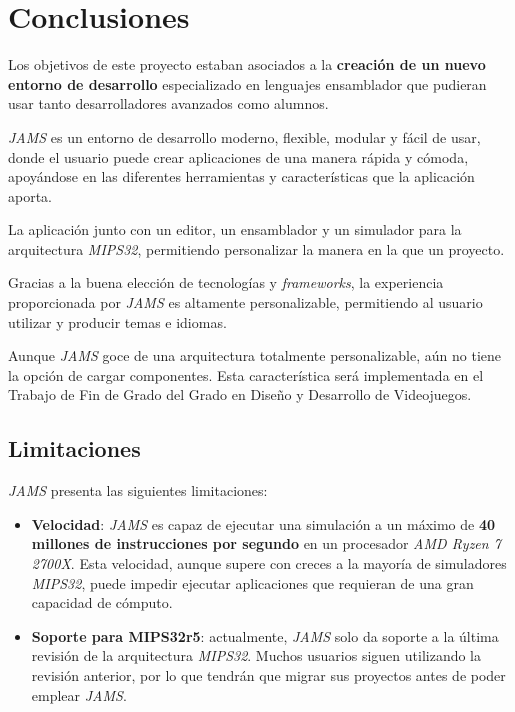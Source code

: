 \chapter{Conclusiones}\label{ch:conclusiones}

Los objetivos de este proyecto estaban asociados a la \textbf{creación
de un nuevo entorno de desarrollo} especializado en lenguajes
ensamblador que pudieran usar tanto desarrolladores avanzados
como alumnos.

\textit{JAMS} es un entorno de desarrollo moderno,
flexible, modular y fácil de usar, donde el usuario puede
crear aplicaciones de una manera rápida y cómoda,
apoyándose en las diferentes herramientas y
características que la aplicación aporta.

La aplicación  junto con un
editor, un ensamblador y un simulador para la arquitectura
\textit{MIPS32}, permitiendo personalizar la manera en la
que  un proyecto.

Gracias a la buena elección de tecnologías y
\textit{frameworks}, la experiencia proporcionada por
\textit{JAMS} es altamente personalizable, permitiendo
al usuario utilizar y producir temas e idiomas.

Aunque \textit{JAMS} goce de una arquitectura
totalmente personalizable, aún no tiene la opción de cargar componentes.
Esta característica será implementada en el Trabajo de Fin de
Grado del Grado en Diseño y Desarrollo de Videojuegos.

\section{Limitaciones}\label{sec:limitaciones}

\textit{JAMS} presenta las siguientes limitaciones:

\begin{itemize}
    \item \textbf{Velocidad}: \textit{JAMS} es capaz de ejecutar
    una simulación a un máximo de \textbf{40 millones de instrucciones por segundo} en un
    procesador \textit{AMD Ryzen 7 2700X}.
    Esta velocidad, aunque supere con creces a la mayoría de simuladores \textit{MIPS32},
    puede impedir ejecutar aplicaciones que requieran de una gran capacidad de cómputo.
    \item \textbf{Soporte para MIPS32r5}: actualmente, \textit{JAMS} solo da soporte
    a la última revisión de la arquitectura \textit{MIPS32}.
    Muchos usuarios siguen utilizando la revisión anterior, por lo que tendrán que migrar
    sus proyectos antes de poder emplear \textit{JAMS}.
\end{itemize}

